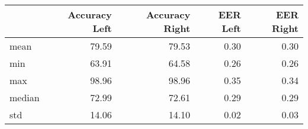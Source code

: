 \begin{tabular}{lrrrr}
\toprule
{} &  Accuracy Left &  Accuracy Right &  EER Left &  EER Right \\
\midrule
mean   &          79.59 &           79.53 &      0.30 &       0.30 \\
min    &          63.91 &           64.58 &      0.26 &       0.26 \\
max    &          98.96 &           98.96 &      0.35 &       0.34 \\
median &          72.99 &           72.61 &      0.29 &       0.29 \\
std    &          14.06 &           14.10 &      0.02 &       0.03 \\
\bottomrule
\end{tabular}
